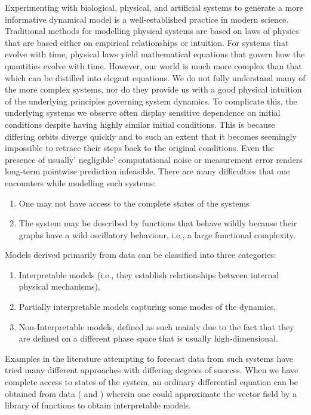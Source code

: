 \documentclass[a4paper,12pt,twoside]{report}
\begin{document}
Experimenting with biological, physical, and artificial systems to generate a more informative dynamical model is a well-established practice in modern science. Traditional methods for modelling physical systems are based on laws of physics that are based either on empirical relationships or intuition. For systems that evolve with time, physical laws yield mathematical equations that govern how the quantities evolve with time. However, our world is much more complex than that which can be distilled into elegant equations. We do not fully understand many of the more complex systems, nor do they provide us with a good physical intuition of the underlying principles governing system dynamics. To complicate this, the underlying systems we observe often display sensitive dependence on initial conditions despite having highly similar initial conditions. This is because differing orbits diverge quickly and to such an extent that it becomes seemingly impossible to retrace their steps back to the original conditions. Even the presence of usually' negligible' computational noise or measurement error renders long-term pointwise prediction infeasible. There are many difficulties that one encounters while modelling such systems:
\vspace{-8mm}
\begin{enumerate}[noitemsep, label=\roman*.]
  \item One may not have access to the complete states of the systems
  \item The system may be described by functions that behave wildly because their graphs have a wild oscillatory behaviour, i.e., a large functional complexity.
\end{enumerate}


Models derived primarily from data can be classified into three categories: 
\vspace{-8mm}
\begin{enumerate}[noitemsep, label=\roman*.]
  \item  Interpretable models (i.e., they establish relationships between internal physical mechanisms), 
  \item Partially interpretable models capturing some modes of the dynamics, 
  \item Non-Interpretable models, defined as such mainly due to the fact that they are defined on a different phase space that is usually high-dimensional. 
\end{enumerate}

Examples in the literature attempting to forecast data from such systems have tried many different approaches with differing degrees of success. 
When we have complete access to states of the system, an ordinary differential equation can be obtained from data (\cite{brunton2016discovering, champion2019data} and \cite{small2002modeling,xu2006modeling}) wherein one could approximate the vector field by a library of functions to obtain interpretable models. 
\end{document}
